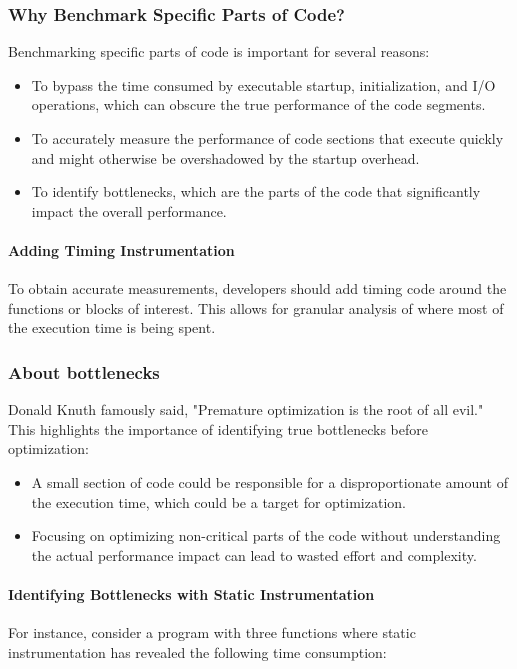 \documentclass[12pt]{article}
\begin{document}
\subsubsection{{Why Benchmark Specific Parts of Code?}}
Benchmarking specific parts of code is important for several reasons:
\begin{itemize}
    \item To bypass the time consumed by executable startup, initialization, and I/O operations, which can obscure the true performance of the code segments.
    \item To accurately measure the performance of code sections that execute quickly and might otherwise be overshadowed by the startup overhead.
    \item To identify bottlenecks, which are the parts of the code that significantly impact the overall performance.
\end{itemize}

\paragraph{{Adding Timing Instrumentation}}
To obtain accurate measurements, developers should add timing code around the functions or blocks of interest. This allows for granular analysis of where most of the execution time is being spent.


\subsubsection{About bottlenecks}

Donald Knuth famously said, "Premature optimization is the root of all evil." This highlights the importance of identifying true bottlenecks before optimization:

\begin{itemize}
    \item A small section of code could be responsible for a disproportionate amount of the execution time, which could be a target for optimization.
    \item Focusing on optimizing non-critical parts of the code without understanding the actual performance impact can lead to wasted effort and complexity.
\end{itemize}

\paragraph{Identifying Bottlenecks with Static Instrumentation}
For instance, consider a program with three functions where static instrumentation has revealed the following time consumption:
\end{document}
